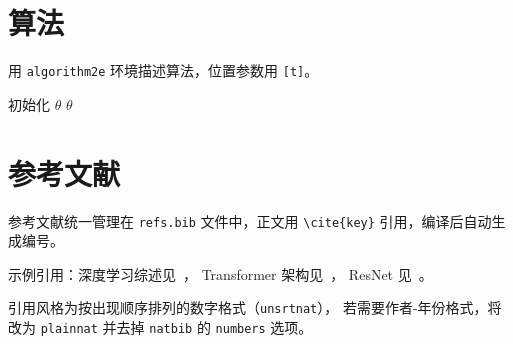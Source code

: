 \documentclass[10pt, twocolumn, a4paper]{article}
\begin{document}
\section{算法}

用 \texttt{algorithm2e} 环境描述算法，位置参数用 \verb|[t]|。

\begin{algorithm}[t]
\caption{算法示例}
\label{alg:example}
初始化 $\theta$\;
\Return $\theta$\;
\end{algorithm}

\section{参考文献}

参考文献统一管理在 \texttt{refs.bib} 文件中，正文用
\verb|\cite{key}| 引用，编译后自动生成编号。

示例引用：深度学习综述见~\cite{lecun2015deep}，
Transformer 架构见~\cite{vaswani2017attention}，
ResNet 见~\cite{he2016deep}。

引用风格为按出现顺序排列的数字格式（\texttt{unsrtnat}），
若需要作者-年份格式，将 \verb|| 改为
\texttt{plainnat} 并去掉 \texttt{natbib} 的 \texttt{numbers} 选项。


\end{document}
